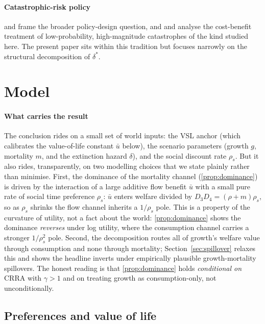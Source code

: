 \documentclass{_latex/house}
\begin{document}
\paragraph{Catastrophic-risk policy} \citet{posner2004catastrophe} and \citet{nordhaus2011economics} frame the broader policy-design question, and \citet{weitzman2009modeling} and \citet{martin2015averting} analyse the cost-benefit treatment of low-probability, high-magnitude catastrophes of the kind studied here. The present paper sits within this tradition but focuses narrowly on the structural decomposition of $\delta^*$.

\section{Model}
\label{sec:model}

\paragraph{What carries the result} The conclusion rides on a small set of world inputs: the VSL anchor (which calibrates the value-of-life constant $\bar u$ below), the scenario parameters (growth $g$, mortality $m$, and the extinction hazard $\delta$), and the social discount rate $\rho_s$. But it also rides, transparently, on two modelling choices that we state plainly rather than minimise. First, the dominance of the mortality channel (\cref{prop:dominance}) is driven by the interaction of a large additive flow benefit $\bar u$ with a small pure rate of social time preference $\rho_s$: $\bar u$ enters welfare divided by $D_3 D_4 = (\rho+m)\rho_s$, so as $\rho_s$ shrinks the flow channel inherits a $1/\rho_s$ pole. This is a property of the curvature of utility, not a fact about the world: \cref{prop:dominance} shows the dominance \emph{reverses} under log utility, where the consumption channel carries a stronger $1/\rho_s^2$ pole. Second, the decomposition routes all of growth's welfare value through consumption and none through mortality; Section~\ref{sec:spillover} relaxes this and shows the headline inverts under empirically plausible growth-mortality spillovers. The honest reading is that \cref{prop:dominance} holds \emph{conditional on} CRRA with $\gamma>1$ and on treating growth as consumption-only, not unconditionally.

\subsection{Preferences and value of life}
\label{sec:utility}
\end{document}
